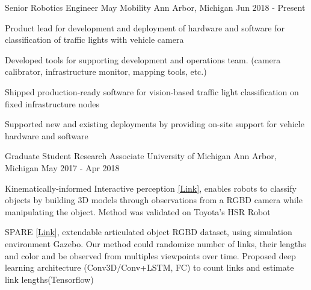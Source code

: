

\begin{cventries}

  \cventry
    {Senior Robotics Engineer} %
    {May Mobility} %
    {Ann Arbor, Michigan} %
    {Jun 2018 - Present} %
    {
      \begin{cvitems} %
        \item {Product lead for development and deployment of hardware and software for classification of traffic lights with vehicle camera}
        \item {Developed tools for supporting development and operations team. (camera calibrator, infrastructure monitor, mapping tools, etc.)}
        \item {Shipped production-ready software for vision-based traffic light classification on fixed infrastructure nodes}
        \item {Supported new and existing deployments by providing on-site support for vehicle hardware and software}
      \end{cvitems}
    }

  \cventry
    {Graduate Student Research Associate} %
    {University of Michigan} %
    {Ann Arbor, Michigan} %
    {May 2017 - Apr 2018} %
    {
      \begin{cvitems} %
        \item {Kinematically-informed Interactive perception \href{https://arxiv.org/abs/1901.05580}{[Link]}, enables robots to classify objects by building 3D models through observations from a RGBD camera while manipulating the object. Method was validated on Toyota’s HSR Robot}
        \item SPARE {\href{https://arxiv.org/abs/1803.11147}{[Link]}, extendable articulated object RGBD dataset, using simulation environment Gazebo. Our method could randomize number of links, their lengths and color and be observed from multiples viewpoints over time. Proposed deep learning architecture (Conv3D/Conv+LSTM, FC) to count links and estimate link lengths(Tensorflow)}
      \end{cvitems}
    }


\end{cventries}
